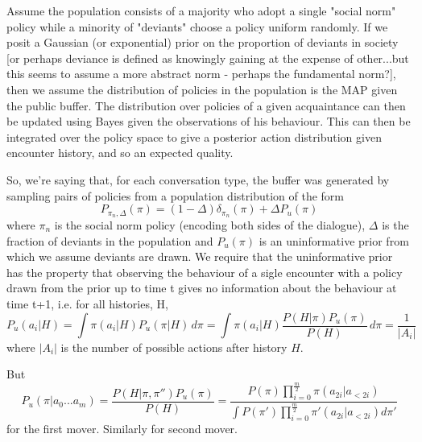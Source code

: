 \documentclass[a4paper]{report}
\begin{document}
Assume the population consists of a majority who adopt a single "social norm" policy while a minority of "deviants" choose a policy uniform randomly. If we posit a Gaussian (or exponential) prior on the proportion of deviants in society [or perhaps deviance is defined as knowingly gaining at the expense of other...but this seems to assume a more abstract norm - perhaps the fundamental norm?], then we assume the distribution of policies in the population is the MAP given the public buffer. The distribution over policies of a given acquaintance can then be updated using Bayes given the observations of his behaviour. This can then be integrated over the policy space to give a posterior action distribution given encounter history, and so an expected quality.

So, we're saying that, for each conversation type, the buffer was generated by sampling pairs of policies from a population distribution of the form 
\[
P_{\pi_n,\Delta}(\pi) = (1-\Delta)\delta_{\pi_n}(\pi) + \Delta P_u(\pi)
\]
where $\pi_n$ is the social norm policy (encoding both sides of the dialogue), $\Delta$ is the fraction of deviants in the population and $P_u(\pi)$ is an uninformative prior from which we assume deviants are drawn. We require that the uninformative prior has the property that observing the behaviour of a sigle encounter with a policy drawn from the prior up to time t gives no information about the behaviour at time t+1, i.e. for all histories, H,
\[
P_u(a_i|H) = \int \pi(a_i|H)P_u(\pi|H) \, d\pi = \int \pi(a_i|H)\frac{P(H|\pi)P_u(\pi)}{P(H)} \, d\pi = \frac{1}{|A_i|}
\]
where $|A_i|$ is the number of possible actions after history $H$.



But
\[
P_u(\pi|a_0...a_m) = \frac{P(H|\pi,\pi'')P_u(\pi)}{P(H)} = \frac{
	P(\pi)\prod_{i=0}^{\frac{m}{2}} \pi(a_{2i}|a_{<2i})
	}{
	\int P(\pi')\prod_{i=0}^{\frac{m}{2}} \pi'(a_{2i}|a_{<2i}) d\pi'
}
\]
for the first mover. Similarly for second mover.
\end{document}
